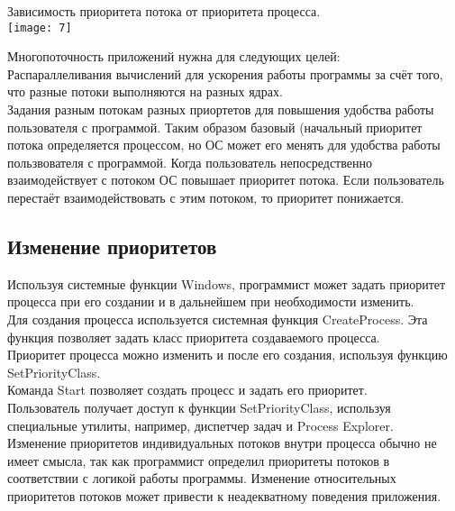 \documentclass[a4paper]{article}
\begin{document}
\begin{center}
	Зависимость приоритета потока от приоритета процесса.\\
	\texttt{[image: 7]}
\end{center}
Многопоточность приложений нужна для следующих целей:\\
Распараллеливания вычислений для ускорения работы программы за счёт того, что разные потоки выполняются на разных ядрах.\\
Задания разным потокам разных приортетов для повышения удобства работы пользователя с программой. Таким образом базовый (начальный приоритет потока определяется процессом, но ОС может его менять для удобства работы пользвователя с программой. Когда пользователь непосредственно взаимодействует с потоком ОС повышает приоритет потока. Если пользователь перестаёт взаимодействовать с этим потоком, то приоритет понижается.\\
\subsection{Изменение приоритетов}
Используя системные функции Windows, программист может задать приоритет процесса при его создании и в дальнейшем при необходимости изменить.\\
Для создания процесса используется системная функция CreateProcess. Эта функция позволяет задать класс приоритета создаваемого процесса.\\
Приоритет процесса можно изменить и после его создания, используя функцию SetPriorityClass.\\
Команда Start позволяет создать процесс и задать его приоритет.\\
Пользователь получает доступ к функции SetPriorityClass, используя специальные утилиты, например, диспетчер задач и Process Explorer.\\
Изменение приоритетов индивидуальных потоков внутри процесса обычно не имеет смысла, так как программист определил приоритеты потоков в соответствии с логикой работы программы. Изменение относительных приоритетов потоков может привести к неадекватному поведения приложения.\\
\end{document}
